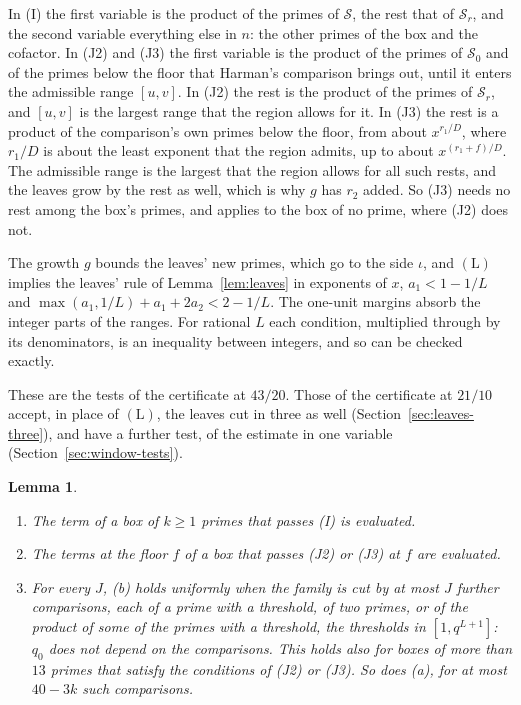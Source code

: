 \documentclass[11pt]{article}
\newtheorem{lemma}[theorem]{Lemma}
\theoremstyle{definition}
\begin{document}
In (I) the first variable is the product of the primes of $\mathcal S$, the rest that of $\mathcal S_r$, and the second
variable everything else in $n$: the other primes of the box and the cofactor. In (J2) and (J3) the first variable is the
product of the primes of $\mathcal S_0$ and of the primes below the floor that Harman's comparison brings out, until it
enters the admissible range $[u, v]$. In (J2) the rest is the product of the primes of $\mathcal S_r$, and $[u, v]$ is
the largest range that the region allows for it. In (J3) the rest is a product of the comparison's own primes below
the floor,
from about $x^{r_1/D}$, where $r_1/D$ is about the least exponent that the region admits, up to about $x^{(r_1 + f)/D}$.
The admissible range is the largest that the region allows for all such rests, and the leaves grow by the rest as
well, which is
why $g$ has $r_2$ added. So (J3) needs no rest among the box's primes, and applies to the box of no prime, where (J2)
does not.

The growth $g$ bounds the leaves' new primes, which go to the side $\iota$, and $(\mathrm L)$ implies the
leaves' rule of Lemma~\ref{lem:leaves} in exponents of $x$, $a_1 < 1 - 1/L$ and $\max(a_1, 1/L) + a_1 + 2a_2 < 2 - 1/L$.
The one-unit margins absorb the integer parts of the ranges. For rational $L$ each condition, multiplied through by its
denominators, is an inequality between integers, and so can be checked exactly.

These are the tests of the certificate at $43/20$. Those of the certificate at $21/10$ accept, in place of $(\mathrm
L)$, the leaves cut in three
as well (Section~\ref{sec:leaves-three}), and have a further test, of the estimate in one variable
(Section~\ref{sec:window-tests}).

\begin{lemma}\label{lem:tests}
\begin{enumerate}
\item[(a)] The term of a box of $k \ge 1$ primes that passes (I) is evaluated.
\item[(b)] The terms at the floor $f$ of a box that passes (J2) or (J3) at $f$ are evaluated.
\item[(c)] For every $J$, (b) holds uniformly when the family is cut by at most $J$ further comparisons, each of a
  prime with a threshold, of two primes, or of the product of some of the primes with a threshold, the thresholds in
  $[1, q^{L + 1}]$: $q_0$ does not depend on the comparisons. This holds also for boxes of more than $13$ primes that
  satisfy the conditions of (J2) or (J3). So does (a), for at most $40 - 3k$ such comparisons.
\end{enumerate}
\end{lemma}
\end{document}
